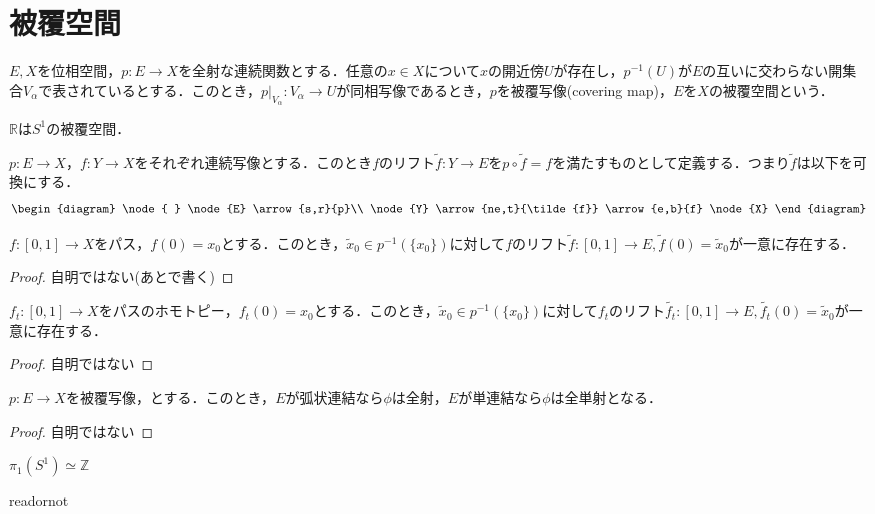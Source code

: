 \documentclass[uplatex]{jsarticle}
\renewcommand{\restriction}[2]{\left. #1 \right|_{#2}}
\begin{document}
\fi

\section{被覆空間}
\begin{teigi}[被覆空間]
  $E,X$を位相空間，$p\colon E \to X$を全射な連続関数とする．任意の$x\in X$について$x$の開近傍$U$が存在し，$p^{-1}(U)$が$E$の互いに交わらない開集合$V_\alpha$で表されているとする．このとき，$\restriction{p}{V_\alpha} \colon V_\alpha \to U$が同相写像であるとき，$p$を被覆写像(covering map)，$E$を$X$の被覆空間という．
\end{teigi}

\begin{rei}
  $\mathbb{R}$は$S^1$の被覆空間．
\end{rei}

\begin{teigi}[リフト]
  $p\colon E\to X$，$f\colon Y\to X$をそれぞれ連続写像とする．このとき$f$のリフト$\tilde{f}\colon Y\to E$を$p\circ \tilde{f} = f$を満たすものとして定義する．つまり$\tilde{f}$は以下を可換にする．
  \begin{align*}
    \begin{diagram}
      \node{ } \node{E} \arrow{s,r}{p}\\
      \node{Y} \arrow{ne,t}{\tilde{f}} \arrow{e,b}{f} \node{X}
    \end{diagram}
  \end{align*}
\end{teigi}

\begin{teiri}
  $f\colon \left[0,1\right]\to X$をパス，$f(0)=x_0$とする．このとき，$\tilde{x}_0 \in p^{-1}(\{x_0\})$に対して$f$のリフト$\tilde{f}\colon \left[0,1\right]\to E,\tilde{f}(0)=\tilde{x}_0$が一意に存在する．
\end{teiri}
\begin{proof}
  自明ではない(あとで書く)
\end{proof}

\begin{teiri}
  $f_t \colon \left[0,1\right]\to X$をパスのホモトピー，$f_t(0)=x_0$とする．このとき，$\tilde{x}_0 \in p^{-1}(\{x_0\})$に対して$f_t$のリフト$\tilde{f_t}\colon \left[0,1\right]\to E,\tilde{f_t}(0)=\tilde{x}_0$が一意に存在する．
\end{teiri}
\begin{proof}
  自明ではない
\end{proof}
\begin{teiri}
  $p\colon E\to X$を被覆写像，とする．このとき，$E$が弧状連結なら$\phi$は全射，$E$が単連結なら$\phi$は全単射となる．
\end{teiri}
\begin{proof}
  自明ではない
\end{proof}
\begin{teiri}
  $\pi_1(S^1) \simeq \mathbb{Z}$
\end{teiri}

\expandafter\ifx\csname readornot\endcsname\relax
  
\end{document}
